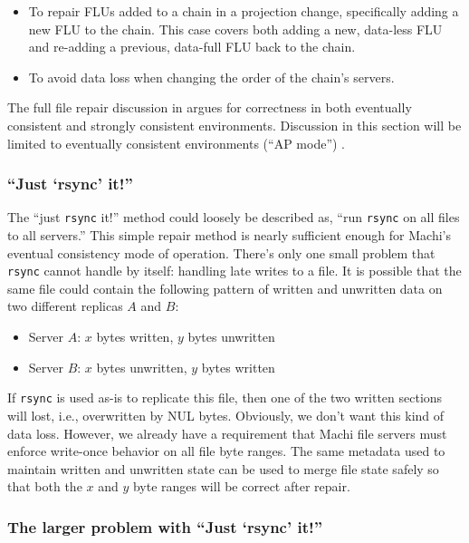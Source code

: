 \documentclass[preprint,10pt]{sigplanconf}
\begin{document}
\begin{itemize}
\item To repair FLUs added to a chain in a projection change,
  specifically adding a new FLU to the chain.  This case covers both
  adding a new, data-less FLU and re-adding a previous, data-full FLU
  back to the chain.
\item To avoid data loss when changing the order of the chain's servers.
\end{itemize}

The full file repair discussion in \cite{machi-chain-manager-design}
argues for correctness in both eventually consistent and strongly
consistent environments.  Discussion in this section will be limited
to eventually consistent environments (``AP mode'') .

\subsubsection{``Just `rsync' it!''}
\label{ssec:just-rsync-it}

The ``just {\tt rsync} it!'' method could loosely be described as,
``run {\tt rsync} on all files to all servers.''  This simple repair
method is nearly sufficient enough for Machi's eventual consistency
mode of operation.  There's only one small problem that {\tt rsync}
cannot handle by itself: handling late writes to a file.  It is
possible that the same file could contain the following pattern of
written and unwritten data on two different replicas $A$ and $B$:

\begin{itemize}
\item Server $A$: $x$ bytes written, $y$ bytes unwritten
\item Server $B$: $x$ bytes unwritten, $y$ bytes written
\end{itemize}

If {\tt rsync} is used as-is to replicate this file, then one of the
two written sections will lost, i.e., overwritten by NUL bytes.  Obviously, we
don't want this kind of data loss.  However, we already have a
requirement that Machi file servers must enforce write-once behavior
on all file byte ranges.  The same metadata used to maintain written and
unwritten state can be used to merge file state safely so that both the $x$
and $y$ byte ranges will be correct after repair.

\subsubsection{The larger problem with ``Just `rsync' it!''}
\end{document}
